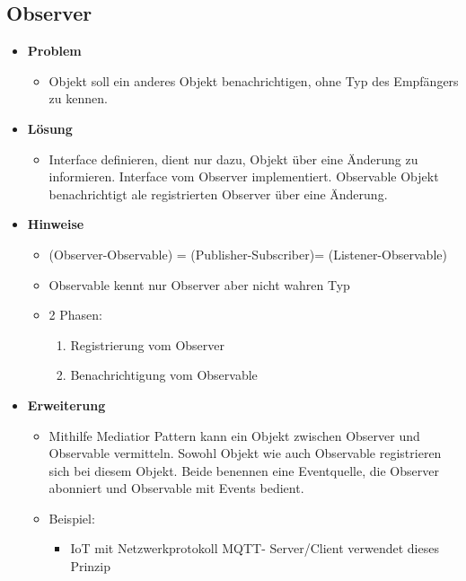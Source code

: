 \documentclass[../ZF_SWEN1.tex]{subfiles}
\begin{document}
\subsection{Observer}
\begin{itemize}
	\item \textbf{Problem}
	\begin{itemize}
		\item Objekt soll ein anderes Objekt benachrichtigen, ohne Typ des Empfängers zu kennen.
	\end{itemize}
	\item \textbf{Lösung}
	\begin{itemize}
		\item Interface definieren, dient nur dazu, Objekt über eine Änderung zu informieren. Interface vom Observer implementiert. Observable Objekt benachrichtigt ale registrierten Observer über eine Änderung.
	\end{itemize}
	\item \textbf{Hinweise}
	\begin{itemize}
		\item (Observer-Observable) = (Publisher-Subscriber)= (Listener-Observable)
		\item Observable kennt nur Observer aber nicht wahren Typ
		\item 2 Phasen:
		\begin{enumerate}
			\item Registrierung vom Observer
			\item Benachrichtigung vom Observable
		\end{enumerate}
	\end{itemize}
	\item \textbf{Erweiterung}
	\begin{itemize}
		\item Mithilfe Mediatior Pattern kann ein Objekt zwischen Observer und Observable vermitteln. Sowohl Objekt wie auch Observable registrieren sich bei diesem Objekt. Beide benennen eine Eventquelle, die Observer abonniert und Observable mit Events bedient.
		\item Beispiel:
		\begin{itemize}
			\item IoT mit Netzwerkprotokoll MQTT- Server/Client verwendet dieses Prinzip
		\end{itemize}
	\end{itemize}
\end{itemize}
\end{document}
